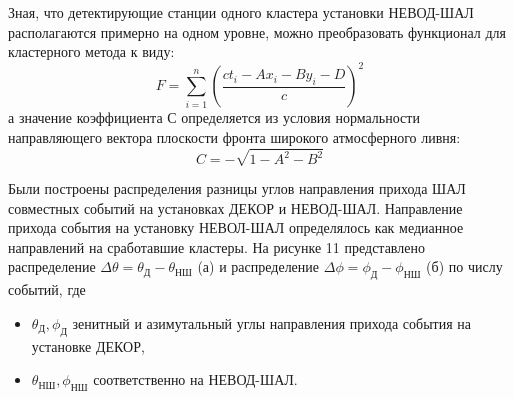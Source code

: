 Зная, что детектирующие станции одного кластера установки НЕВОД-ШАЛ располагаются примерно на одном уровне, можно преобразовать функционал для кластерного метода к виду:
\begin{equation}
F = \sum_{i=1}^{n} \left(\frac{ct_i - Ax_i - By_i - D}{c} \right)^2
\end{equation}
а значение коэффициента С определяется из условия нормальности направляющего вектора
плоскости фронта широкого атмосферного ливня:
\begin{equation}
C = - \sqrt{1-A^2 - B^2}
\end{equation}

Были построены распределения разницы углов направления прихода ШАЛ совместных событий на установках ДЕКОР и НЕВОД-ШАЛ. Направление прихода события на установку НЕВОЛ-ШАЛ определялось как медианное направлений на сработавшие кластеры. На рисунке 11 представлено распределение \(\Delta \theta = \theta_{\text{Д}} - \theta_{\text{НШ}}\) (а) и распределение \(\Delta \phi = \phi_{\text{Д}} - \phi_{\text{НШ}}\) (б) по числу событий, где
\begin{itemize}
    \item \(\theta_{\text{Д}}, \phi_{\text{Д}}\) зенитный и азимутальный углы направления прихода события на установке ДЕКОР,
    \item \(\theta_{\text{НШ}}, \phi_{\text{НШ}}\) соответственно на НЕВОД-ШАЛ.
\end{itemize}

